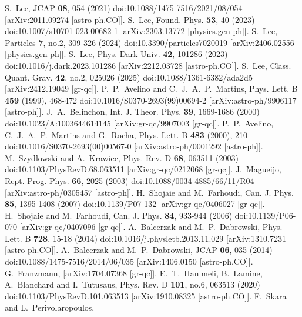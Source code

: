 \documentclass[jkps,preprint,fleqn]{revtex4}
\begin{document}
\begin{thebibliography}{999}
S.~Lee,
JCAP \textbf{08}, 054 (2021)
doi:10.1088/1475-7516/2021/08/054
[arXiv:2011.09274 [astro-ph.CO]].
S.~Lee,
Found. Phys. \textbf{53}, 40 (2023)
doi:10.1007/s10701-023-00682-1
[arXiv:2303.13772 [physics.gen-ph]].
S.~Lee,
Particles \textbf{7}, no.2, 309-326 (2024)
doi:10.3390/particles7020019
[arXiv:2406.02556 [physics.gen-ph]].
S.~Lee,
Phys. Dark Univ. \textbf{42}, 101286 (2023)
doi:10.1016/j.dark.2023.101286
[arXiv:2212.03728 [astro-ph.CO]].
S.~Lee,
Class. Quant. Grav. \textbf{42}, no.2, 025026 (2025)
doi:10.1088/1361-6382/ada2d5
[arXiv:2412.19049 [gr-qc]].
P.~P.~Avelino and C.~J.~A.~P.~Martins,
Phys. Lett. B \textbf{459} (1999), 468-472
doi:10.1016/S0370-2693(99)00694-2
[arXiv:astro-ph/9906117 [astro-ph]].
J.~A.~Belinchon,
Int. J. Theor. Phys. \textbf{39}, 1669-1686 (2000)
doi:10.1023/A:1003644614145
[arXiv:gr-qc/9907003 [gr-qc]].
P.~P.~Avelino, C.~J.~A.~P.~Martins and G.~Rocha,
Phys. Lett. B \textbf{483} (2000), 210
doi:10.1016/S0370-2693(00)00567-0
[arXiv:astro-ph/0001292 [astro-ph]].
M.~Szydlowski and A.~Krawiec,
Phys. Rev. D \textbf{68}, 063511 (2003)
doi:10.1103/PhysRevD.68.063511
[arXiv:gr-qc/0212068 [gr-qc]].
J.~Magueijo,
Rept. Prog. Phys. \textbf{66}, 2025 (2003)
doi:10.1088/0034-4885/66/11/R04
[arXiv:astro-ph/0305457 [astro-ph]].
H.~Shojaie and M.~Farhoudi,
Can. J. Phys. \textbf{85}, 1395-1408 (2007)
doi:10.1139/P07-132
[arXiv:gr-qc/0406027 [gr-qc]].
H.~Shojaie and M.~Farhoudi,
Can. J. Phys. \textbf{84}, 933-944 (2006)
doi:10.1139/P06-070
[arXiv:gr-qc/0407096 [gr-qc]].
A.~Balcerzak and M.~P.~Dabrowski,
Phys. Lett. B \textbf{728}, 15-18 (2014)
doi:10.1016/j.physletb.2013.11.029
[arXiv:1310.7231 [astro-ph.CO]].
A.~Balcerzak and M.~P.~Dabrowski,
JCAP \textbf{06}, 035 (2014)
doi:10.1088/1475-7516/2014/06/035
[arXiv:1406.0150 [astro-ph.CO]].
G.~Franzmann,
[arXiv:1704.07368 [gr-qc]].
E.~T.~Hanımeli, B.~Lamine, A.~Blanchard and I.~Tutusaus,
Phys. Rev. D \textbf{101}, no.6, 063513 (2020)
doi:10.1103/PhysRevD.101.063513
[arXiv:1910.08325 [astro-ph.CO]].
F.~Skara and L.~Perivolaropoulos,

\end{thebibliography}
\end{document}
